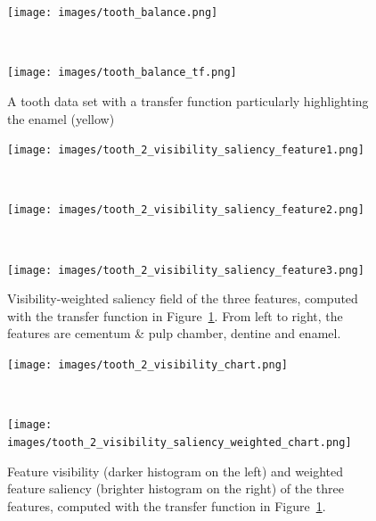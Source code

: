 \begin{figure}
	\centering
	\begin{minipage}{.2\textwidth}
		\texttt{[image: images/tooth\_balance.png]}
	\end{minipage}~
	\begin{minipage}{.1\textwidth}
		\texttt{[image: images/tooth\_balance\_tf.png]}
	\end{minipage}
	\caption{A tooth data set with a transfer function particularly highlighting the enamel (yellow)}
	\label{fig:tooth_2}
\end{figure}

\begin{figure}
	\centering
	\begin{minipage}{.15\textwidth}
		\texttt{[image: images/tooth\_2\_visibility\_saliency\_feature1.png]}
	\end{minipage}~
	\begin{minipage}{.15\textwidth}
		\texttt{[image: images/tooth\_2\_visibility\_saliency\_feature2.png]}
	\end{minipage}~
	\begin{minipage}{.15\textwidth}
		\texttt{[image: images/tooth\_2\_visibility\_saliency\_feature3.png]}
	\end{minipage}
	\caption{Visibility-weighted saliency field of the three features, computed with the transfer function in Figure~\ref{fig:tooth_2}. From left to right, the features are cementum \& pulp chamber, dentine and enamel.}
	\label{fig:tooth_saliency_field_2}
\end{figure}

\begin{figure}
	\centering
	\begin{minipage}{.2\textwidth}
		\texttt{[image: images/tooth\_2\_visibility\_chart.png]}
	\end{minipage}~
	\begin{minipage}{.2\textwidth}
		\texttt{[image: images/tooth\_2\_visibility\_saliency\_weighted\_chart.png]}
	\end{minipage}
	\caption{Feature visibility (darker histogram on the left) and weighted feature saliency (brighter histogram on the right) of the three features, computed with the transfer function in Figure~\ref{fig:tooth_2}.}
	\label{fig:tooth_saliency_chart_2}
\end{figure}

